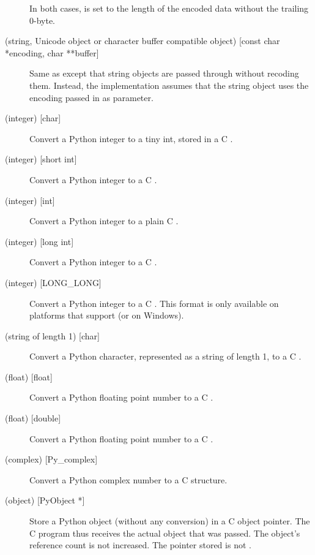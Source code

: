 \begin{description}
In both cases,  is set to the length of the
encoded data without the trailing 0-byte.

\item[\samp{et\#} (string, Unicode object or character buffer compatible
object) {[const char *encoding, char **buffer]}]
Same as  except that string objects are passed through without
recoding them. Instead, the implementation assumes that the string
object uses the encoding passed in as parameter.

\item[\samp{b} (integer) {[char]}]
Convert a Python integer to a tiny int, stored in a C .

\item[\samp{h} (integer) {[short int]}]
Convert a Python integer to a C .

\item[\samp{i} (integer) {[int]}]
Convert a Python integer to a plain C .

\item[\samp{l} (integer) {[long int]}]
Convert a Python integer to a C .

\item[\samp{L} (integer) {[LONG_LONG]}]
Convert a Python integer to a C .  This format is only
available on platforms that support  (or 
on Windows).

\item[\samp{c} (string of length 1) {[char]}]
Convert a Python character, represented as a string of length 1, to a
C .

\item[\samp{f} (float) {[float]}]
Convert a Python floating point number to a C .

\item[\samp{d} (float) {[double]}]
Convert a Python floating point number to a C .

\item[\samp{D} (complex) {[Py_complex]}]
Convert a Python complex number to a C  structure.

\item[\samp{O} (object) {[PyObject *]}]
Store a Python object (without any conversion) in a C object pointer.
The C program thus receives the actual object that was passed.  The
object's reference count is not increased.  The pointer stored is not
\NULL.


\end{description}
